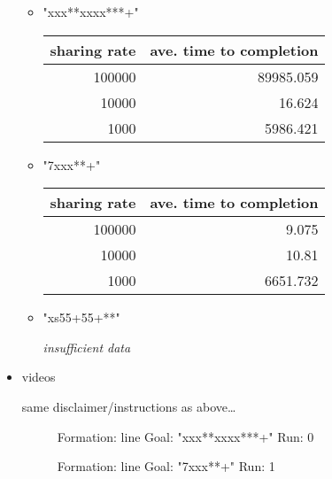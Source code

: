 \documentclass[11pt]{article}
\begin{document}
\begin{itemize}
\begin{itemize}
\item "xxx**xxxx***+"\\
\label{sec-1.5.4.2.1}


\begin{center}
\begin{tabular}{rr}
 sharing rate  &  ave. time to completion  \\
\hline
       100000  &                89985.059  \\
        10000  &                   16.624  \\
         1000  &                 5986.421  \\
\end{tabular}
\end{center}




\item "7xxx**+"\\
\label{sec-1.5.4.2.2}


\begin{center}
\begin{tabular}{rr}
 sharing rate  &  ave. time to completion  \\
\hline
       100000  &                    9.075  \\
        10000  &                    10.81  \\
         1000  &                 6651.732  \\
\end{tabular}
\end{center}




\item "xs55+55+**"\\
\label{sec-1.5.4.2.3}


 \emph{insufficient data}

\end{itemize} %

\item videos\\
\label{sec-1.5.4.3}

same disclaimer/instructions as above\ldots{}

  \begin{figure}
  \centering
  \caption{Formation: line Goal: "xxx**xxxx***+" Run: 0}
  \end{figure}


  \begin{figure}
  \centering
  \caption{Formation: line Goal: "7xxx**+" Run: 1}
  \end{figure}



\end{itemize}
\end{document}
